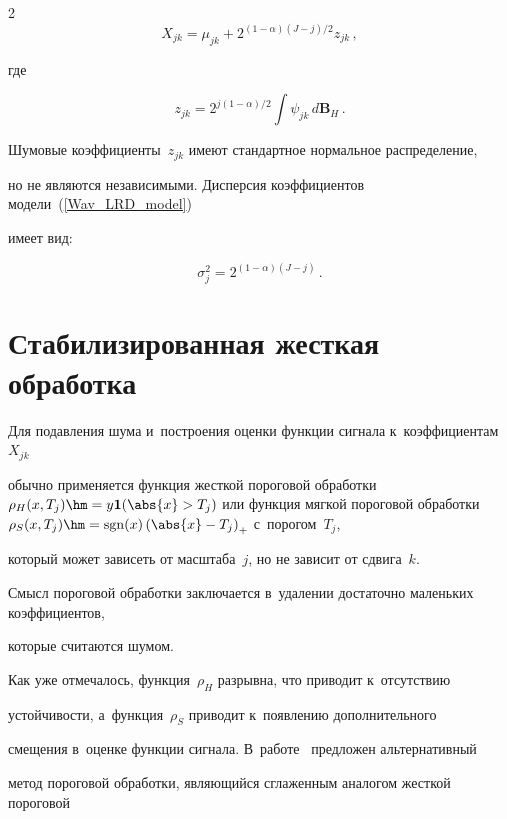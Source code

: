 \begin{multicols}{2}
\begin{equation}
X_{jk} = \mu_{jk} +  2^{{(1-\alpha)(J-j)}/{2}} z_{jk}\,,

\label{Wav_LRD_model}

\end{equation}

где 

$$

z_{jk}=2^{{j(1-\alpha)}/{2}} \int \psi_{jk}\, d\mathbf{B}_H\,. 

$$



Шумовые коэффициенты~$z_{jk}$ имеют стандартное нормальное распределение, 

но не являются независимыми. Дис\-пер\-сия коэффициентов модели~(\ref{Wav_LRD_model}) 

имеет вид:

$$

\sigma_j^2= 2^{(1-\alpha)(J-j)}\,.

$$





\section{Стабилизированная жесткая обработка}



Для подавления шума и~построения оценки функции сигнала к~коэффициентам~$X_{jk}$ 

обычно применяется функция жесткой пороговой обработки $\rho_{H}(x,T_j)

\hm=y\I(\abs{x}>T_j)$ или функция мяг\-кой пороговой обработки $\rho_{S}(x,T_j)

\hm=\mathrm{sgn}(x)\left(\abs{x}-T_j\right)_{+}$ с~порогом~$T_j$, 

который может зависеть от мас\-шта\-ба~$j$, но не зависит от сдвига~$k$. 

Смысл пороговой обработки заключается в~удалении до\-ста\-точ\-но маленьких коэффициентов, 

которые считаются шумом.



Как уже отмечалось, функция~$\rho_{H}$ разрывна, что приводит к~отсутствию 

устой\-чи\-вости, а~функция~$\rho_{S}$ приводит к~по\-яв\-ле\-нию дополнительного 

смещения в~оценке функции сигнала. В~работе~\cite{HL10} предложен альтернативный 

метод пороговой обработки, являющийся сгла\-жен\-ным аналогом жест\-кой пороговой 


\end{multicols}
